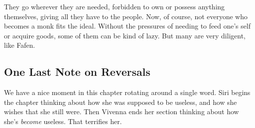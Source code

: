 They go wherever they are needed, forbidden to own or possess anything themselves, giving all they have to the people. Now, of course, not everyone who becomes a monk fits the ideal. Without the pressures of needing to feed one’s self or acquire goods, some of them can be kind of lazy. But many are very diligent, like Fafen.

\subsection*{One Last Note on Reversals}

We have a nice moment in this chapter rotating around a single word. Siri begins the chapter thinking about how she was supposed to be useless, and how she wishes that she still were. Then Vivenna ends her section thinking about how she’s \textit{become} useless. That terrifies her.



